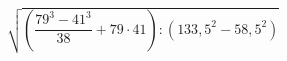 \begin{ex}[type=calculate]
	\begin{condition}
		\( \sqrt{\left( \dfrac{79^3-41^3}{38}+79\cdot41 \right):(133,5^2-58,5^2)} \)
	\end{condition}
\end{ex}